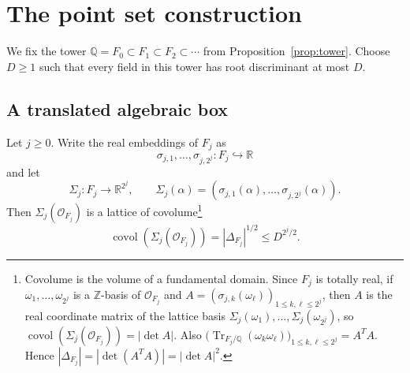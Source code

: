 \section{The point set construction}
\label{sec:point-set-construction}

We fix the tower \(\mathbb Q=F_0\subset F_1\subset F_2\subset\cdots\) from Proposition~\ref{prop:tower}.
Choose \(D\ge1\) such that every field in this tower has root discriminant at most \(D\).

\subsection{A translated algebraic box}
\label{subsec:translated-box}

Let \(j\ge0\).
Write the real embeddings of \(F_j\) as
\begin{equation}\label{eq:real-embeddings}
\sigma_{j,1},\ldots,\sigma_{j,2^j}:F_j\hookrightarrow\mathbb R
\end{equation}
and let
\begin{equation}\label{eq:sigma-map}
\Sigma_j:F_j\to\mathbb R^{2^j},
\qquad
\Sigma_j(\alpha)=(\sigma_{j,1}(\alpha),\ldots,\sigma_{j,2^j}(\alpha)).
\end{equation}
Then \(\Sigma_j(\mathcal O_{F_j})\) is a lattice of covolume\footnote{Covolume is the volume of a fundamental domain. Since \(F_j\) is totally real, if \(\omega_1,\ldots,\omega_{2^j}\) is a \(\mathbb Z\)-basis of \(\mathcal O_{F_j}\) and \(A=(\sigma_{j,k}(\omega_\ell))_{1\le k,\ell\le 2^j}\), then \(A\) is the real coordinate matrix of the lattice basis \(\Sigma_j(\omega_1),\ldots,\Sigma_j(\omega_{2^j})\), so \(\operatorname{covol}(\Sigma_j(\mathcal O_{F_j}))=|\det A|\). Also \(\bigl(\operatorname{Tr}_{F_j/\mathbb Q}(\omega_k\omega_\ell)\bigr)_{1\le k,\ell\le 2^j}=A^TA\). Hence \(|\Delta_{F_j}|=|\det(A^TA)|=|\det A|^2\).}
\begin{equation}\label{eq:covolume-bound}
\operatorname{covol}(\Sigma_j(\mathcal O_{F_j}))
=|\Delta_{F_j}|^{1/2}
\le D^{2^j/2}.
\end{equation}

